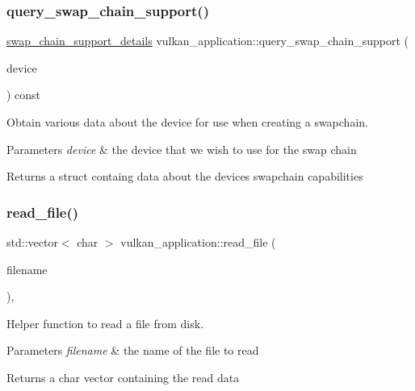 \subsubsection{\texorpdfstring{query\+\_\+swap\+\_\+chain\+\_\+support()}{query\_swap\_chain\_support()}}
{\footnotesize\ttfamily \mbox{\hyperlink{structswap__chain__support__details}{swap\+\_\+chain\+\_\+support\+\_\+details}} vulkan\+\_\+application\+::query\+\_\+swap\+\_\+chain\+\_\+support (\begin{DoxyParamCaption}\item[{const Vk\+Physical\+Device}]{device }\end{DoxyParamCaption}) const\hspace{0.3cm}{\ttfamily [private]}}



Obtain various data about the device for use when creating a swapchain. 


\begin{DoxyParams}{Parameters}
{\em device} & the device that we wish to use for the swap chain \\
\hline
\end{DoxyParams}
\begin{DoxyReturn}{Returns}
a struct containg data about the device\textquotesingle{}s swapchain capabilities 
\end{DoxyReturn}
\mbox{\label{classvulkan__application_ac0e61a90deaf38512932e9f59c2ab9ca}} 
\subsubsection{\texorpdfstring{read\+\_\+file()}{read\_file()}}
{\footnotesize\ttfamily std\+::vector$<$ char $>$ vulkan\+\_\+application\+::read\+\_\+file (\begin{DoxyParamCaption}\item[{const std\+::string \&}]{filename }\end{DoxyParamCaption})\hspace{0.3cm}{\ttfamily [static]}, {\ttfamily [private]}}



Helper function to read a file from disk. 


\begin{DoxyParams}{Parameters}
{\em filename} & the name of the file to read \\
\hline
\end{DoxyParams}
\begin{DoxyReturn}{Returns}
a char vector containing the read data 
\end{DoxyReturn}
\mbox{\label{classvulkan__application_a0190af17a510960b757dbcf037a70fa9}} 
